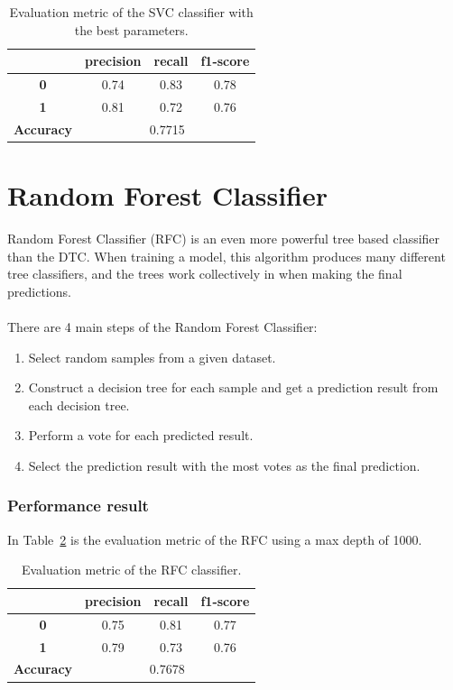 \documentclass[a4paper]{report}
\begin{document}
{{\begin{table}[h!]
\centering
\begin{tabular}{  c | c | c | c |}
\cline{2-4}
&  \textbf { precision } &  \textbf  { recall } & \textbf  { f1-score }  \\
\hline
\multicolumn{1}{|c|}{ \textbf {0}} & 0.74 & 0.83 & 0.78 \\
\hline
\multicolumn{1}{|c|}{ \textbf {1}} & 0.81 & 0.72 & 0.76 \\
\hline
\hline
\multicolumn{1}{|c|}{ \textbf {Accuracy}} & \multicolumn{3}{|c|}{0.7715} \\
\hline
\end{tabular}
\caption{Evaluation metric of the SVC classifier with the best parameters.}
\label{table:SVC_performance}
\end{table}

\section{Random Forest Classifier}
Random Forest Classifier (RFC) is an even more powerful tree based classifier than the DTC. When training a model, this algorithm produces many different tree classifiers, and the trees work collectively in when making the final predictions. 
\\\\
There are 4 main steps of the Random Forest Classifier:

\begin{enumerate}
	\item Select random samples from a given dataset.
	\item Construct a decision tree for each sample and get a prediction result from each decision tree.
	\item Perform a vote for each predicted result.
	\item Select the prediction result with the most votes as the final prediction.
\end{enumerate}


\subsubsection{Performance result}
In Table~\ref{table:RFC_performance} is the evaluation metric of the RFC using a max depth of 1000.

\begin{table}[h!]
\centering
\begin{tabular}{  c | c | c | c |}
\cline{2-4}
&  \textbf { precision } &  \textbf  { recall } & \textbf  { f1-score }  \\
\hline
\multicolumn{1}{|c|}{ \textbf {0}} & 0.75 & 0.81 & 0.77 \\
\hline
\multicolumn{1}{|c|}{ \textbf {1}} & 0.79 & 0.73 & 0.76 \\
\hline
\hline
\multicolumn{1}{|c|}{ \textbf {Accuracy}} & \multicolumn{3}{|c|}{0.7678} \\
\hline
\end{tabular}
\caption{Evaluation metric of the RFC classifier.}
\label{table:RFC_performance}
\end{table}

}}
\end{document}
